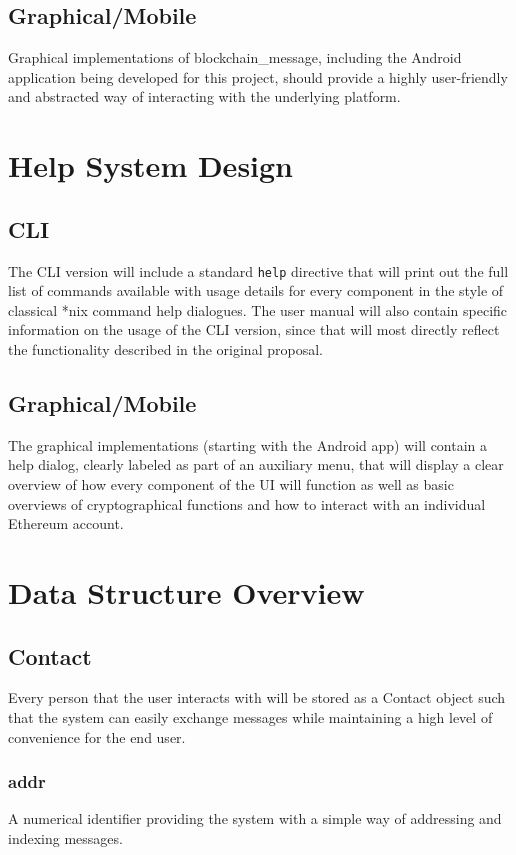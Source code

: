 \documentclass[titlepage]{report}
\begin{document}
\subsection{Graphical/Mobile}
Graphical implementations of blockchain\_message, including the Android application being developed for this project, should provide a highly user-friendly and abstracted way of interacting with the underlying platform.

\section{Help System Design}

\subsection{CLI}
The CLI version will include a standard \verb|help| directive that will print out the full list of commands available with usage details for every component in the style of classical *nix command help dialogues. The user manual will also contain specific information on the usage of the CLI version, since that will most directly reflect the functionality described in the original proposal.

\subsection{Graphical/Mobile}
The graphical implementations (starting with the Android app) will contain a help dialog, clearly labeled as part of an auxiliary menu, that will display a clear overview of how every component of the UI will function as well as basic overviews of cryptographical functions and how to interact with an individual \gls{Ethereum} account.

\section{Data Structure Overview}
\subsection{Contact}
Every person that the user interacts with will be stored as a Contact object such that the system can easily exchange messages while maintaining a high level of convenience for the end user.

\subsubsection{addr}
A numerical identifier providing the system with a simple way of addressing and indexing messages.
\end{document}
